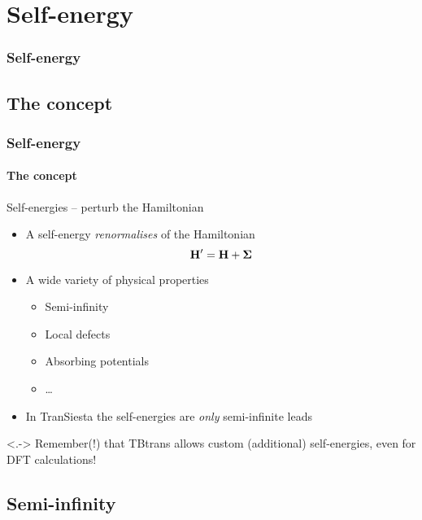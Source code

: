 \section{Self-energy}

\begin{framenologo}
  \frametitle{Self-energy}
  \tableofcontents[currentsection]
\end{framenologo}

\subsection{The concept}

\begin{frame}
  \frametitle{Self-energy}
  \framesubtitle{The concept}

  \begin{block}{Self-energies -- perturb the Hamiltonian}
    
    \begin{itemize}[<+->]
      \item A self-energy \emph{renormalises} of the Hamiltonian
      \begin{equation*}
        \mathbf{H}' = \mathbf{H} + \boldsymbol{\Sigma}
      \end{equation*}
      \item A wide variety of physical properties
      \begin{itemize}[<.->]
        \item Semi-infinity
        \item Local defects
        \item Absorbing potentials
        \item \dots
      \end{itemize}
      \item In TranSiesta the self-energies are \emph{only} semi-infinite leads
    \end{itemize}

    \uncover<.->{
        Remember(!) that TBtrans allows custom (additional) self-energies, even for DFT calculations!
    }

  \end{block}

\end{frame}

\subsection{Semi-infinity}

